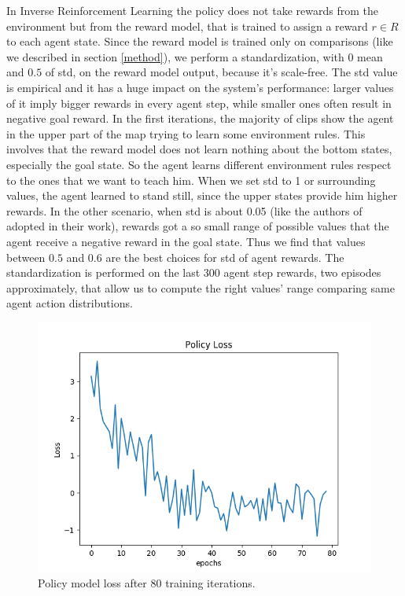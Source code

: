 In Inverse Reinforcement Learning the policy does not take rewards from the environment but from the reward model, that is trained to assign a reward $r\in R$ to each agent state. Since the reward model is trained only on comparisons (like we described in section \ref{method}), we perform a standardization, with $0$ mean and $0.5$ of std, on the reward model output, because it's scale-free. The std value is empirical and it has a huge impact on the system's performance: larger values of it imply bigger rewards in every agent step, while smaller ones often result in negative goal reward. In the first iterations, the majority of clips show the agent in the upper part of the map trying to learn some environment rules. This involves that the reward model does not learn nothing about the bottom states, especially the goal state. So the agent learns different environment rules respect to the ones that we want to teach him.
When we set std to 1 or surrounding values, the agent learned to stand still, since the upper states provide him higher rewards. In the other scenario, when std is about 0.05 (like the authors of \cite{NIPS2018_8025} adopted in their work), rewards got a so small range of possible values that the agent receive a negative reward in the goal state. Thus we find that values between $0.5$ and $0.6$ are the best choices for std of agent rewards. 
The standardization is performed on the last 300 agent step rewards, two episodes approximately, that allow us to compute the right values' range comparing same agent action distributions.

\begin{figure}[t]
    \centering
    \includegraphics[width=\linewidth]{data/policy_loss_80.png} 
    \caption{Policy model loss after 80 training iterations.}
	\label{fig:losspolicy}%
\end{figure}

